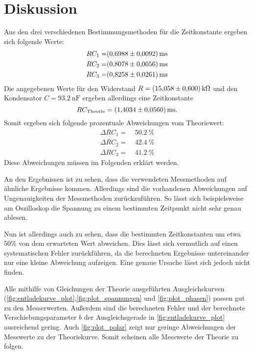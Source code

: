 \section{Diskussion}
\label{sec:Diskussion}


Aus den drei verschiedenen Bestimmungsmethoden für die Zeitkonstante ergeben sich folgende Werte:
\begin{align}
    RC_1 =& \SI{0.6988+-0.0092}{\milli\second} \\
    RC_2 =& \SI{0.8078+-0.0056}{\milli\second} \\
    RC_3 =& \SI{0.8258+-0.0261}{\milli\second}
\end{align}
Die angegebenen Werte für den Widerstand $R=\SI{15.058+-0.6}{\kilo\ohm}$ und den Kondensator $C=\SI{93.2}{\nano\farad}$ ergeben allerdings eine Zeitkonstante
\begin{equation}
    RC_\text{Theorie} = \SI{1.4034+-0.056}{\milli\second}.
\end{equation}
Somit ergeben sich folgende prozentuale Abweichungen vom Theoriewert:
\begin{align}
    \Delta RC_1 = & \: \SI{50.2}{\percent} \\
    \Delta RC_2 = & \: \SI{42.4}{\percent} \\
    \Delta RC_3 = & \: \SI{41.2}{\percent} 
\end{align} 
Diese Abweichungen müssen im Folgenden erklärt werden.

An den Ergebnissen ist zu sehen, dass die verwendeten Messmethoden auf ähnliche Ergebnisse kommen.
Allerdings sind die vorhandenen Abweichungen auf Ungenauigkeiten der Messmethoden zurückzuführen. So lässt sich beispielsweise am Oszilloskop die Spannung zu einem bestimmten Zeitpunkt nicht sehr genau ablesen. 

Nun ist allerdings auch zu sehen, dass die bestimmten Zeitkonstanten um etwa 50\% von dem erwarteten Wert abweichen. Dies lässt sich vermutlich auf einen systematischen Fehler zurückführen, da die berechneten Ergebnisse untereinander nur eine kleine Abweichung aufzeigen. Eine genaue Ursache lässt sich jedoch nicht finden.

Alle mithilfe von Gleichungen der Theorie ausgeführten Ausgleichskurven (\autoref{fig:entladekurve_plot},\autoref{fig:plot_spannungen} und \autoref{fig:plot_phasen}) passen gut zu den Messerwerten. 
Außerdem sind die berechneten Fehler und der berechnete Verschiebungsparameter $b$ der Ausgleichsgerade in \autoref{fig:entladekurve_plot} ausreichend gering. 
Auch \autoref{fig:plot_polar} zeigt nur geringe Abweichungen der Messwerte zu der Theoriekurve. 
Somit scheinen alle Messwerte der Theorie zu folgen.

